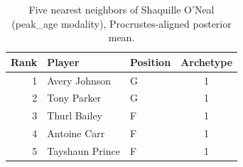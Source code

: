 \begin{table}[htbp]
  \centering\small
  \begin{tabular}{rllc}
    \toprule
    Rank & Player & Position & Archetype \\
    \midrule
    1 & Avery Johnson & G & 1 \\
    2 & Tony Parker & G & 1 \\
    3 & Thurl Bailey & F & 1 \\
    4 & Antoine Carr & F & 1 \\
    5 & Tayshaun Prince & F & 1 \\
    \bottomrule
  \end{tabular}
  \caption{Five nearest neighbors of Shaquille O'Neal (peak_age modality), Procrustes-aligned posterior mean.}
  \label{tab:Shaquille_O_Neal_neighbors_peak_age}
\end{table}

